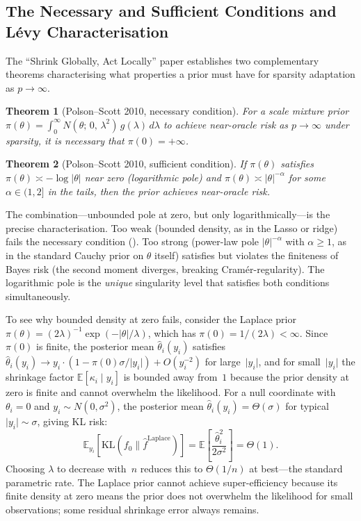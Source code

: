 \documentclass[12pt]{article}
\newtheorem{theorem}{Theorem}[section]
\newcommand{\E}{\mathbb{E}}
\newcommand{\KL}{\mathrm{KL}}
\newcommand{\abs}[1]{\lvert #1 \rvert}
\begin{document}
\subsection{The Necessary and Sufficient Conditions and L\'evy Characterisation}\label{sec:nec-suf}

The ``Shrink Globally, Act Locally'' paper \citep{polson2010shrink} establishes two complementary theorems characterising what properties a prior must have for sparsity adaptation as $p \to \infty$.

\begin{theorem}[Polson--Scott 2010, necessary condition]\label{thm:ps-nec}
For a scale mixture prior $\pi(\theta) = \int_0^\infty N(\theta;\, 0,\, \lambda^2)\, g(\lambda)\, d\lambda$ to achieve near-oracle risk as $p \to \infty$ under sparsity, it is necessary that $\pi(0) = +\infty$.
\end{theorem}

\begin{theorem}[Polson--Scott 2010, sufficient condition]\label{thm:ps-suf}
If $\pi(\theta)$ satisfies $\pi(\theta) \asymp -\log\abs{\theta}$ near zero (logarithmic pole) and $\pi(\theta) \asymp \abs{\theta}^{-\alpha}$ for some $\alpha \in (1,2]$ in the tails, then the prior achieves near-oracle risk.
\end{theorem}

The combination---unbounded pole at zero, but only logarithmically---is the precise characterisation. Too weak (bounded density, as in the Lasso or ridge) fails the necessary condition (). Too strong (power-law pole $\abs{\theta}^{-\alpha}$ with $\alpha \geq 1$, as in the standard Cauchy prior on $\theta$ itself) satisfies  but violates the finiteness of Bayes risk (the second moment diverges, breaking Cram\'er-regularity). The logarithmic pole is the \emph{unique} singularity level that satisfies both conditions simultaneously.

To see why bounded density at zero fails, consider the Laplace prior $\pi(\theta) = (2\lambda)^{-1}\exp(-\abs{\theta}/\lambda)$, which has $\pi(0) = 1/(2\lambda) < \infty$. Since $\pi(0)$ is finite, the posterior mean $\hat{\theta}_i(y_i)$ satisfies $\hat{\theta}_i(y_i) \to y_i \cdot (1 - \pi(0)\sigma/\abs{y_i}) + O(y_i^{-2})$ for large~$\abs{y_i}$, and for small~$\abs{y_i}$ the shrinkage factor $\E[\kappa_i \mid y_i]$ is bounded away from~$1$ because the prior density at zero is finite and cannot overwhelm the likelihood. For a null coordinate with $\theta_i = 0$ and $y_i \sim N(0, \sigma^2)$, the posterior mean $\hat{\theta}_i(y_i) = \Theta(\sigma)$ for typical $\abs{y_i} \sim \sigma$, giving KL risk:
\begin{equation}\label{eq:lasso-kl}
  \E_{y_i}\!\left[\KL(f_0 \| \hat{f}^{\mathrm{Laplace}})\right]
  = \E\!\left[\frac{\hat{\theta}_i^2}{2\sigma^2}\right]
  = \Theta(1).
\end{equation}
Choosing $\lambda$ to decrease with~$n$ reduces this to $\Theta(1/n)$ at best---the standard parametric rate. The Laplace prior cannot achieve super-efficiency because its finite density at zero means the prior does not overwhelm the likelihood for small observations; some residual shrinkage error always remains.
\end{document}
